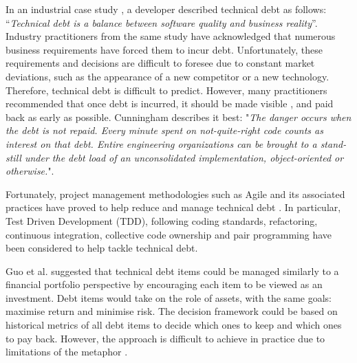 \documentclass{mprop}
\begin{document}
In an industrial case study \cite{Lim2012}, a developer described technical debt
as follows: ``\textit{Technical debt is a balance between software quality and
	business reality}''. Industry practitioners from the same study have
acknowledged that numerous business requirements have forced them to incur debt.
Unfortunately, these requirements and decisions are difficult to foresee due to
constant market deviations, such as the appearance of a new competitor or a new
technology. Therefore, technical debt is difficult to predict. However, many
practitioners recommended that once debt is incurred, it should be made visible
\cite{Lim2012} \cite{Codabux2013} \cite{Morgenthaler2012}, and paid back as
early as possible. Cunningham \cite{Cunningham1993} describes it best:
"\textit{The danger occurs when the debt is not repaid. Every minute spent on
	not-quite-right code counts as interest on that debt. Entire engineering
	organizations can be brought to a stand-still under the debt load of an
	unconsolidated implementation, object-oriented or otherwise.}".

Fortunately, project management methodologies such as Agile and its associated
practices have proved to help reduce and manage technical debt
\cite{Holvitie2014} \cite{Trumler2016}. In particular, Test Driven Development (TDD),
following coding standards, refactoring, continuous integration, collective code
ownership and pair programming have been considered to help tackle technical
debt.

Guo et al. \cite{Guo2011} suggested that technical debt items could be managed
similarly to a financial portfolio perspective by encouraging each item to be
viewed as an investment. Debt items would take on the role of assets, with the
same goals: maximise return and minimise risk. The decision framework could be
based on historical metrics of all debt items to decide which ones to keep and
which ones to pay back. However, the approach is difficult to achieve in
practice due to limitations of the metaphor \cite{Schmid2013}.
\end{document}
